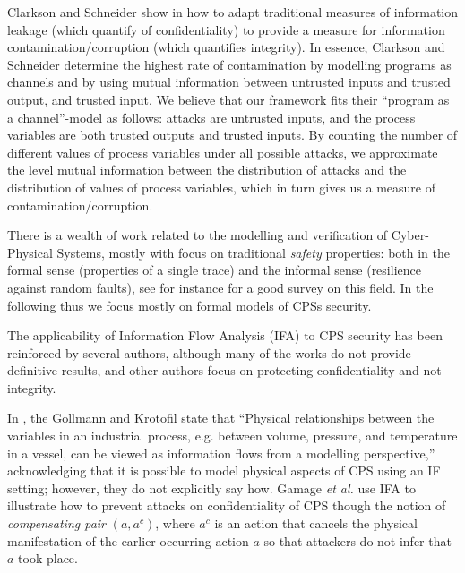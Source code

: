 {{\color{red}
{
Clarkson and Schneider show in \cite{QuantitativeIntegrity} how to adapt traditional measures of information leakage (which quantify of confidentiality) to provide a measure for information contamination/corruption (which quantifies integrity). In essence, Clarkson and Schneider determine the highest rate of contamination by modelling programs as channels and by using mutual information between untrusted inputs and trusted output, and trusted input. We believe that our framework fits their ``program as a channel''-model as follows: attacks are untrusted inputs, and the process variables are both trusted outputs and trusted inputs. By counting the number of different values of process variables under all possible attacks, we approximate the level mutual information between the distribution of attacks and the distribution of values of process variables, which in turn gives us a measure of contamination/corruption.  
}

There is a wealth of work related to the modelling and verification of Cyber-Physical Systems, mostly with focus on traditional \emph{safety} properties: both in the formal sense (properties of a single trace) and the 
informal sense (resilience against random faults), see for instance \cite{alur2015principles} for a good survey on this field. In the following thus we focus mostly on formal models of CPSs security.

The applicability of Information Flow Analysis (IFA) to CPS security has been reinforced by several authors, although many of the works do not provide definitive results, and other authors focus on protecting confidentiality and not integrity.
{
}

In \cite{CPSSec}, the Gollmann and Krotofil state that ``Physical relationships between the variables in an industrial process, e.g. between volume, pressure, and temperature in a vessel, can be viewed as information flows from a modelling perspective,'' acknowledging that it is possible to model physical aspects of CPS using an IF setting; however, they do not explicitly say how. Gamage \emph{et al.} \cite{Gamage2010} use IFA to illustrate how to prevent attacks on confidentiality of CPS though the notion of \emph{compensating pair} $(a, a^c)$, where $a^c$ is an action that cancels the physical manifestation of the earlier occurring action $a$ so that attackers do not infer that $a$ took place.

}}
